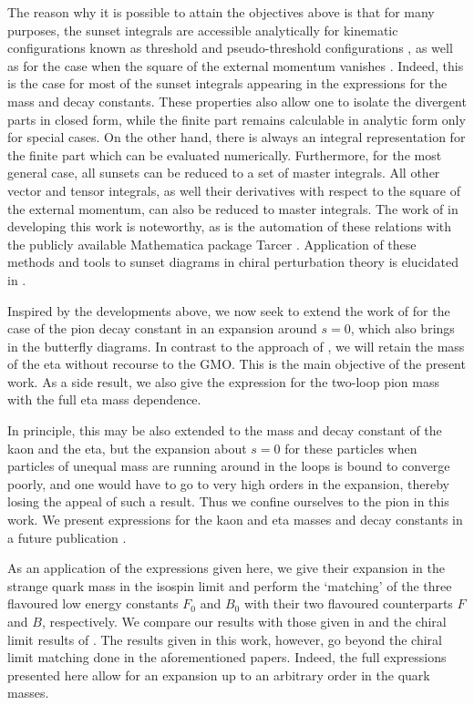 \documentclass[12pt,a4paper]{article}
\begin{document}
The reason why it is possible to attain the objectives above is that for many purposes, the sunset integrals are accessible analytically for kinematic configurations known as threshold and pseudo-threshold configurations \cite{Berends:1997vk}, as well as for the case when the square of the external momentum vanishes \cite{Davydychev:1992mt}. Indeed, this is the case for most of the sunset integrals appearing in the expressions for the mass and decay constants. These properties also allow one to isolate the divergent parts in closed form, while the finite part remains calculable in analytic form only for special cases.  On the other hand, there is always an integral representation for the finite part which can be evaluated numerically. Furthermore, for the most general case, all sunsets can be reduced to a set of master integrals.  All other vector and tensor integrals, as well their derivatives with respect to the square of the external momentum, can also be reduced to master integrals. The work of \cite{Tarasov:1997kx} in developing this work is noteworthy, as is the automation of these relations with the publicly available Mathematica package Tarcer \cite{Mertig:1998vk}. Application of these methods and tools to sunset diagrams in chiral perturbation theory is elucidated in \cite{Ananthanarayan:2016pos}.

Inspired by the developments above, we now seek to extend the work of \cite{Kaiser:2007kf} for the case of the pion decay constant in an expansion around $s=0$, which also brings in the butterfly diagrams.  In contrast to the approach of \cite{Kaiser:2007kf}, we will retain the mass of the eta without recourse to the GMO. This is the main objective of the present work. As a side result, we also give the expression for the two-loop pion mass with the full eta mass dependence.

In principle, this may be also extended to the mass and decay constant of the kaon and the eta, but the expansion about $s=0$ for these particles when particles of unequal mass are running around in the loops is bound to converge poorly, and one would have to go to very high orders in the expansion, thereby losing the appeal of such a result. Thus we confine ourselves to the pion in this work. We present expressions for the kaon and eta masses and decay constants in a future publication \cite{ABFG:2017}.

As an application of the expressions given here, we give their expansion in the strange quark mass in the isospin limit and perform the `matching' of the three flavoured low energy constants $F_0$ and $B_0$ with their two flavoured counterparts $F$ and $B$, respectively. We compare our results with those given in \cite{Kaiser:2006uv} and the chiral limit results of \cite{Gasser:2007sg}. The results given in this work, however, go beyond the chiral limit matching done in the aforementioned papers. Indeed, the full expressions presented here allow for an expansion up to an arbitrary order in the quark masses.
\end{document}
